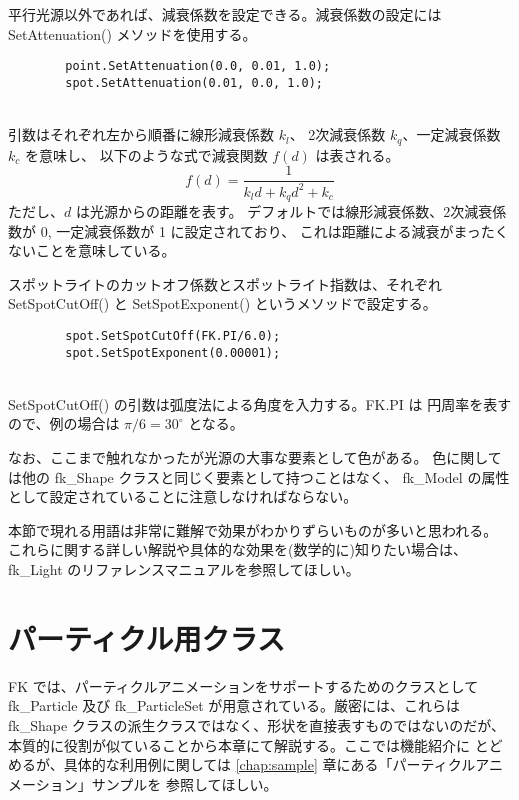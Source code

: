 平行光源以外であれば、減衰係数を設定できる。減衰係数の設定には
SetAttenuation() メソッドを使用する。
\\
\begin{screen}
\begin{verbatim}
        point.SetAttenuation(0.0, 0.01, 1.0);
        spot.SetAttenuation(0.01, 0.0, 1.0);
\end{verbatim}
\end{screen}
~ \\
引数はそれぞれ左から順番に線形減衰係数 \(k_l\)、
2次減衰係数 \(k_q\)、一定減衰係数 \(k_c\) を意味し、
以下のような式で減衰関数 \(f(d)\) は表される。
\[
	f(d) = \frac{1}{k_ld + k_qd^2 + k_c}
\]
ただし、\(d\) は光源からの距離を表す。
デフォルトでは線形減衰係数、2次減衰係数が 0, 一定減衰係数が 1 に設定されており、
これは距離による減衰がまったくないことを意味している。

スポットライトのカットオフ係数とスポットライト指数は、それぞれ
SetSpotCutOff() と SetSpotExponent() というメソッドで設定する。
\\
\begin{screen}
\begin{verbatim}
        spot.SetSpotCutOff(FK.PI/6.0);
        spot.SetSpotExponent(0.00001);
\end{verbatim}
\end{screen}
~ \\
SetSpotCutOff() の引数は弧度法による角度を入力する。FK.PI は
円周率を表すので、例の場合は \(\pi/6 = 30^{\circ}\) となる。

なお、ここまで触れなかったが光源の大事な要素として色がある。
色に関しては他の fk\_Shape クラスと同じく要素として持つことはなく、
fk\_Model の属性として設定されていることに注意しなければならない。

本節で現れる用語は非常に難解で効果がわかりずらいものが多いと思われる。
これらに関する詳しい解説や具体的な効果を(数学的に)知りたい場合は、
fk\_Light のリファレンスマニュアルを参照してほしい。

\section{パーティクル用クラス} \label{sec:particle}
FK では、パーティクルアニメーションをサポートするためのクラスとして
fk\_Particle 及び fk\_ParticleSet が用意されている。厳密には、これらは
fk\_Shape クラスの派生クラスではなく、形状を直接表すものではないのだが、
本質的に役割が似ていることから本章にて解説する。ここでは機能紹介に
とどめるが、具体的な利用例に関しては
\ref{chap:sample} 章にある「パーティクルアニメーション」サンプルを
参照してほしい。

